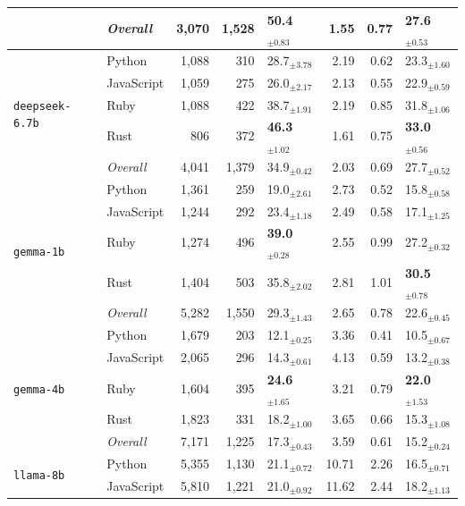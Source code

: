 \begin{longtable}{@{}llrrp{0.72cm}rrp{0.72cm}@{}}
      & \textit{Overall} & 3,070 & 1,528 & 50.4$_{\pm 0.83}$ & 1.55 & 0.77 & 27.6$_{\pm 0.53}$ \\
    \midrule
      \multirow{5}{*}{\texttt{deepseek-6.7b}} & Python & 1,088 & 310 & 28.7$_{\pm 3.78}$ & 2.19 & 0.62 & 23.3$_{\pm 1.60}$ \\
       & JavaScript & 1,059 & 275 & 26.0$_{\pm 2.17}$ & 2.13 & 0.55 & 22.9$_{\pm 0.59}$ \\
       & Ruby & 1,088 & 422 & 38.7$_{\pm 1.91}$ & 2.19 & 0.85 & 31.8$_{\pm 1.06}$ \\
       & Rust & 806 & 372 & \textbf{46.3$_{\pm 1.02}$} & 1.61 & 0.75 & \textbf{33.0$_{\pm 0.56}$} \\ \cmidrule(lr){2-8}
      & \textit{Overall} & 4,041 & 1,379 & 34.9$_{\pm 0.42}$ & 2.03 & 0.69 & 27.7$_{\pm 0.52}$ \\
    \midrule
      \multirow{5}{*}{\texttt{gemma-1b}} & Python & 1,361 & 259 & 19.0$_{\pm 2.61}$ & 2.73 & 0.52 & 15.8$_{\pm 0.58}$ \\
       & JavaScript & 1,244 & 292 & 23.4$_{\pm 1.18}$ & 2.49 & 0.58 & 17.1$_{\pm 1.25}$ \\
       & Ruby & 1,274 & 496 & \textbf{39.0$_{\pm 0.28}$} & 2.55 & 0.99 & 27.2$_{\pm 0.32}$ \\
       & Rust & 1,404 & 503 & 35.8$_{\pm 2.02}$ & 2.81 & 1.01 & \textbf{30.5$_{\pm 0.78}$} \\ \cmidrule(lr){2-8}
      & \textit{Overall} & 5,282 & 1,550 & 29.3$_{\pm 1.43}$ & 2.65 & 0.78 & 22.6$_{\pm 0.45}$ \\
    \midrule
      \multirow{5}{*}{\texttt{gemma-4b}} & Python & 1,679 & 203 & 12.1$_{\pm 0.25}$ & 3.36 & 0.41 & 10.5$_{\pm 0.67}$ \\
       & JavaScript & 2,065 & 296 & 14.3$_{\pm 0.61}$ & 4.13 & 0.59 & 13.2$_{\pm 0.38}$ \\
       & Ruby & 1,604 & 395 & \textbf{24.6$_{\pm 1.65}$} & 3.21 & 0.79 & \textbf{22.0$_{\pm 1.53}$} \\
       & Rust & 1,823 & 331 & 18.2$_{\pm 1.00}$ & 3.65 & 0.66 & 15.3$_{\pm 1.08}$ \\ \cmidrule(lr){2-8}
      & \textit{Overall} & 7,171 & 1,225 & 17.3$_{\pm 0.43}$ & 3.59 & 0.61 & 15.2$_{\pm 0.24}$ \\
    \midrule
      \multirow{5}{*}{\texttt{llama-8b}} & Python & 5,355 & 1,130 & 21.1$_{\pm 0.72}$ & 10.71 & 2.26 & 16.5$_{\pm 0.71}$ \\
       & JavaScript & 5,810 & 1,221 & 21.0$_{\pm 0.92}$ & 11.62 & 2.44 & 18.2$_{\pm 1.13}$ \\

\end{longtable}
